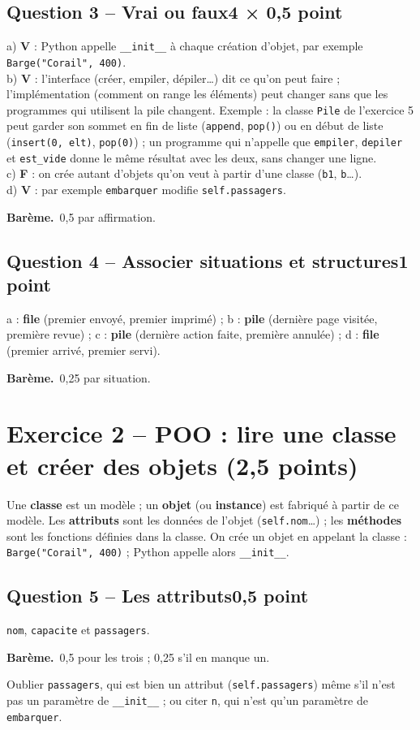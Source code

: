 \documentclass[11pt, a4paper]{exam}
\newcommand{\code}[1]{\texttt{#1}}
\newcommand{\Qt}[2]{\par\needspace{10\baselineskip}\subsection*{#1\hfill{\normalfont\small #2}}}
\newcommand{\bareme}[1]{\par\noindent\textbf{Barème.}\ #1\par\smallskip}
\begin{document}
\Qt{Question 3 -- Vrai ou faux}{4 × 0,5 point}
\begin{reponse}
a) \textbf{V} : Python appelle \code{\_\_init\_\_} à chaque création d'objet, par exemple \code{Barge("Corail", 400)}.\\
b) \textbf{V} : l'interface (créer, empiler, dépiler…) dit ce qu'on peut faire ; l'implémentation (comment on range les éléments) peut changer sans que les programmes qui utilisent la pile changent. Exemple : la classe \code{Pile} de l'exercice 5 peut garder son sommet en fin de liste (\code{append}, \code{pop()}) ou en début de liste (\code{insert(0, elt)}, \code{pop(0)}) ; un programme qui n'appelle que \code{empiler}, \code{depiler} et \code{est\_vide} donne le même résultat avec les deux, sans changer une ligne.\\
c) \textbf{F} : on crée autant d'objets qu'on veut à partir d'une classe (\code{b1}, \code{b}…).\\
d) \textbf{V} : par exemple \code{embarquer} modifie \code{self.passagers}.
\end{reponse}
\bareme{0,5 par affirmation.}

\Qt{Question 4 -- Associer situations et structures}{1 point}
\begin{reponse}
a : \textbf{file} (premier envoyé, premier imprimé) ; b : \textbf{pile} (dernière page visitée, première revue) ; c : \textbf{pile} (dernière action faite, première annulée) ; d : \textbf{file} (premier arrivé, premier servi).
\end{reponse}
\bareme{0,25 par situation.}

\section*{Exercice 2 -- POO : lire une classe et créer des objets (2,5 points)}

\begin{retenir}
Une \textbf{classe} est un modèle ; un \textbf{objet} (ou \textbf{instance}) est fabriqué à partir de ce modèle. Les \textbf{attributs} sont les données de l'objet (\code{self.nom}…) ; les \textbf{méthodes} sont les fonctions définies dans la classe. On crée un objet en appelant la classe : \code{Barge("Corail", 400)} ; Python appelle alors \code{\_\_init\_\_}.
\end{retenir}

\Qt{Question 5 -- Les attributs}{0,5 point}
\begin{reponse}
\code{nom}, \code{capacite} et \code{passagers}.
\end{reponse}
\bareme{0,5 pour les trois ; 0,25 s'il en manque un.}
\begin{erreur}
Oublier \code{passagers}, qui est bien un attribut (\code{self.passagers}) même s'il n'est pas un paramètre de \code{\_\_init\_\_} ; ou citer \code{n}, qui n'est qu'un paramètre de \code{embarquer}.
\end{erreur}
\end{document}

